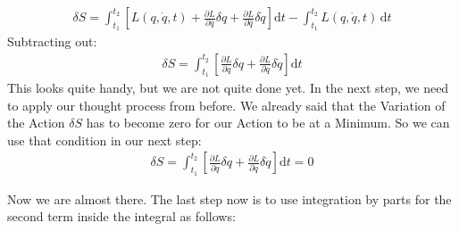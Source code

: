 \documentclass{article}
\begin{document}
	\begin{align}
		\delta S = \int_{t_1}^{t_2} \left[L(q,\dot{q}, t) + \frac{\partial L}{\partial q}\delta q +\frac{\partial L}{\partial \dot{q}}\delta\dot{q}\right] \text{d}t - \int_{t_1}^{t_2} L(q,\dot{q}, t)\, \text{d}t 
	\end{align}
	Subtracting out:
	\begin{align}
		\delta S = \int_{t_1}^{t_2}\left[ \frac{\partial L}{\partial q}\delta q +\frac{\partial L}{\partial \dot{q}}\delta\dot{q} \right] \text{d}t
	\end{align}
	This looks quite handy, but we are not quite done yet. In the next step, we need to apply our thought process from before. We already said that the Variation of the Action $\delta S $ has to become zero for our Action to be at a Minimum. So we can use that condition in our next step:
	\begin{align}
		\delta S = \int_{t_1}^{t_2}\left[ \frac{\partial L}{\partial q}\delta q +\frac{\partial L}{\partial \dot{q}}\delta\dot{q} \right] \text{d}t = 0 
	\end{align}
	
	Now we are almost there. The last step now is to use integration by parts for the second term inside the integral as follows:
	
\end{document}
